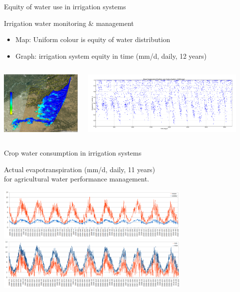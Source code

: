 \documentclass[xcolor=dvipsnames,beamer]{beamer} %
\begin{document}
\begin{frame}[fragile]{Equity of water use in irrigation systems}

Irrigation water monitoring \& management
\begin{itemize}
 \item Map: Uniform colour is equity of water distribution
 \item Graph: irrigation system equity in time (mm/d, daily, 12 years)
\end{itemize}

\begin{columns}[l]
\begin{center}
\includegraphics[width=4cm]{fess2012ef}
\end{center}

\begin{flushright}
  \includegraphics[width=8cm]{fess2012meaneftemporal}
\end{flushright}
\end{columns}

\end{frame}

\begin{frame}[fragile]{Crop water consumption in irrigation systems}

Actual evapotranspiration (mm/d, daily, 11 years)\\ 
for agricultural water performance management.\\

\begin{center}
 \includegraphics[width=9.5cm]{ciameanet}\\
 \includegraphics[width=9.5cm]{ciaminmaxet}
\end{center}

\end{frame}
\end{document}
